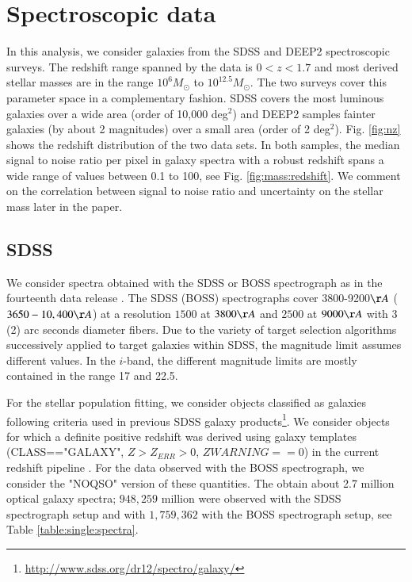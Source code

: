 \documentclass[onecolumn]{aa}
\begin{document}
\section{Spectroscopic data}
\label{sec:DATA}

In this analysis, we consider galaxies from the SDSS and DEEP2 spectroscopic surveys. 
The redshift range spanned by the data is $0<z<1.7$ and most derived stellar masses are in the range $10^6 M_\odot$ to $10^{12.5} M_\odot$. 
The two surveys cover this parameter space in a complementary fashion. 
SDSS covers the most luminous galaxies over a wide area (order of 10,000 deg$^2$) and DEEP2 samples fainter galaxies (by about 2 magnitudes) over a small area (order of 2 deg$^2$). 
Fig. \ref{fig:nz} shows the redshift distribution of the two data sets. 
In both samples, the median signal to noise ratio per pixel in galaxy spectra with a robust redshift spans a wide range of values between 0.1 to 100, see Fig. \ref{fig:mass:redshift}. 
We comment on the correlation between signal to noise ratio and uncertainty on the stellar mass later in the paper. 
%
\subsection{SDSS}
We consider spectra obtained with the SDSS or BOSS spectrograph \citep{2006AJ....131.2332G,Smee2013} as in the fourteenth data release \citep{dawson_2016,blanton_2017,SDSS_DR14}. 
The SDSS (BOSS) spectrographs cover 3800-9200$\AA$ ($3650-10,400\AA$) at a resolution $1500$ at $3800\AA$ and $2500$ at $9000\AA$ with 3 (2) arc seconds diameter fibers.
Due to the variety of target selection algorithms successively applied to target galaxies within SDSS, the magnitude limit assumes different values. In the $i$-band, the different magnitude limits are mostly contained in the range 17 and 22.5. 

For the stellar population fitting, we consider objects classified as galaxies following criteria used in previous SDSS galaxy products\footnote{\url{http://www.sdss.org/dr12/spectro/galaxy/}}.
We consider objects for which a definite positive redshift was derived using galaxy templates 
(CLASS=="GALAXY", $Z>Z_{ERR}>0$, $ZWARNING==0$) in the current redshift pipeline \citep[][version v5\_10\_0]{2012AJ....144..144B}. 
For the data observed with the BOSS spectrograph, we consider the "NOQSO" version of these quantities. 
The obtain about 2.7 million optical galaxy spectra; $948,259$ million were observed with the SDSS spectrograph setup and with $1,759,362$ with the BOSS spectrograph setup, see Table \ref{table:single:spectra}. 
\end{document}

